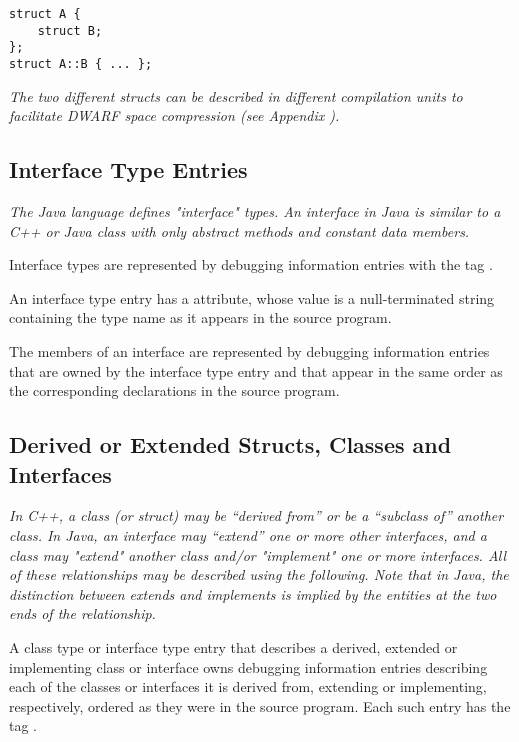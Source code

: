 \begin{lstlisting}
struct A {
    struct B;
};
struct A::B { ... };
\end{lstlisting}

\textit{The two different structs can be described in 
different compilation units to 
facilitate DWARF space compression 
(see Appendix ).}

\subsection{Interface Type Entries}
\label{chap:interfacetypeentries}

\textit{The Java language defines "interface" types. An interface
in Java is similar to a C++ or Java class with only abstract
methods and constant data members.}

Interface types are represented by debugging information
entries with the 
tag .

An interface type entry has a  attribute, whose
value is a null-terminated string containing the type name
as it appears in the source program.

The members of an interface are represented by debugging
information entries that are owned by the interface type
entry and that appear in the same order as the corresponding
declarations in the source program.

\subsection{Derived or Extended Structs, Classes and Interfaces}
\label{chap:derivedorextendedstructsclasesandinterfaces}

\textit{In C++, a class (or struct) may be ``derived from'' or be a
``subclass of'' another class. In Java, an interface may ``extend''
one or more other interfaces, and a class may "extend" another
class and/or "implement" one or more interfaces. All of these
relationships may be described using the following. Note that
in Java, the distinction between extends and implements is
implied by the entities at the two ends of the relationship.}

A class type or interface type entry that describes a
derived, extended or implementing class or interface owns
debugging information entries describing each of the classes
or interfaces it is derived from, extending or implementing,
respectively, ordered as they were in the source program. Each
such entry has the 
tag .

